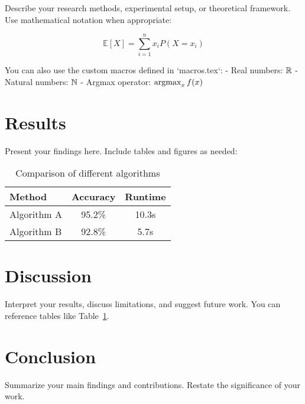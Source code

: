 \documentclass[12pt]{article}
\begin{document}
Describe your research methods, experimental setup, or theoretical framework. Use mathematical notation when appropriate:

\begin{equation}
    \mathbb{E}[X] = \sum_{i=1}^{n} x_i P(X = x_i)
\end{equation}

You can also use the custom macros defined in `macros.tex`:
- Real numbers: $\mathbb{R}$
- Natural numbers: $\mathbb{N}$
- Argmax operator: $\operatorname{argmax}_{x} f(x)$

\section{Results}

Present your findings here. Include tables and figures as needed:

\begin{table}[h]
\centering
\begin{tabular}{@{}lcc@{}}
\toprule
Method & Accuracy & Runtime \\
\midrule
Algorithm A & 95.2\% & 10.3s \\
Algorithm B & 92.8\% & 5.7s \\
\bottomrule
\end{tabular}
\caption{Comparison of different algorithms}
\label{tab:results}
\end{table}

\section{Discussion}

Interpret your results, discuss limitations, and suggest future work. You can reference tables like Table~\ref{tab:results}.

\section{Conclusion}

Summarize your main findings and contributions. Restate the significance of your work.


\printbibliography
\end{document}
